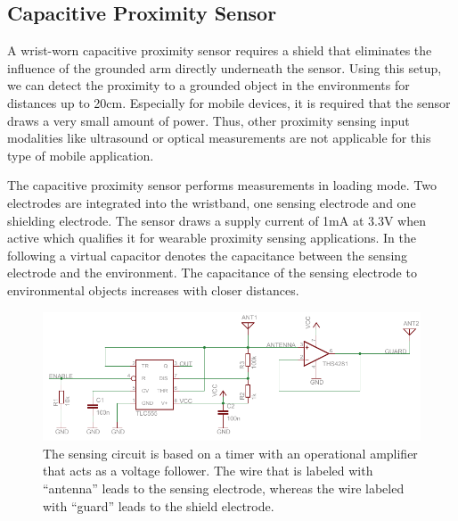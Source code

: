 \documentclass[runningheads,a4paper]{llncs}
\begin{document}
\subsection{Capacitive Proximity Sensor}

A wrist-worn capacitive proximity sensor requires a shield that eliminates the influence of the grounded arm directly underneath the sensor. Using this setup, we can detect the proximity to a grounded object in the environments for distances up to 20cm. Especially for mobile devices, it is required that the sensor draws a very small amount of power. Thus, other proximity sensing input modalities like ultrasound or optical measurements are not applicable for this type of mobile application.

The capacitive proximity sensor performs measurements in loading mode. Two electrodes are integrated into the wristband, one sensing electrode and one shielding electrode. The sensor draws a supply current of 1mA at 3.3V when active which qualifies it for wearable proximity sensing applications. In the following a virtual capacitor denotes the capacitance between the sensing electrode and the environment. The capacitance of the sensing electrode to environmental objects increases with closer distances.

\begin{figure}[t]
	\centering
		\includegraphics[width=1.00\textwidth]{Images/schematic.pdf}
	\caption{The sensing circuit is based on a timer with an operational amplifier that acts as a voltage follower. The wire that is labeled with ``antenna'' leads to the sensing electrode, whereas the wire labeled with ``guard'' leads to the shield electrode.}
	\label{fig:schematic}
\end{figure}
\end{document}
